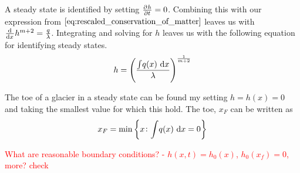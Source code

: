 A steady state is identified by setting $\pd{h}{t} = 0$. Combining this with our expression from $\eqref{eq:rescaled_conservation_of_matter}$ leaves us with $ \od{}{x}h^{m+2} = \frac{q}{\lambda}$. Integrating and solving for $h$ leaves us with the following equation for identifying steady states.
%
\begin{equation}
    h = \left(\frac{{\int}q(x)\,\dif{x}}{\lambda}\right)^{\frac{1}{m+2}}
\end{equation}

The toe of a glacier in a steady state can be found my setting $h = h(x) = 0$ and taking the smallest value for which this hold. The toe, $x_F$ can be written as 
%
\begin{equation}
    x_F = \min\left\{x \colon {\int}q(x)\,\dif{x} = 0\right\}
\end{equation}

\textcolor{red}{What are reasonable boundary conditions? - $h(x, t) = h_0(x)$, $h_0(x_f) = 0$, more? check}
